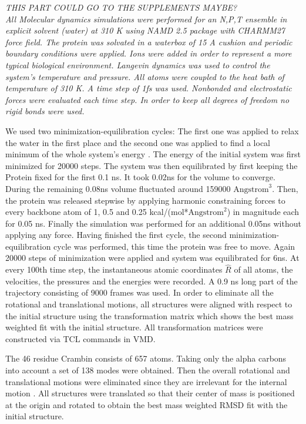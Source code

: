 \documentclass{article}
\begin{document}
{\it THIS PART COULD GO TO THE SUPPLEMENTS MAYBE?\\
All Molecular dynamics simulations were performed for an N,P,T
ensemble in explicit solvent (water) at 310 K using NAMD 2.5 package
with CHARMM27 force field. The protein was solvated in a waterbox of
15 A cushion and periodic boundary conditions were applied. Ions were
added in order to represent a more typical biological
environment. Langevin dynamics was used to control the system's
temperature and pressure. All atoms were coupled to the heat bath of
temperature of 310 K. A time step of 1fs was used. Nonbonded and
electrostatic forces were evaluated each time step. In order to keep
all degrees of freedom no rigid bonds were used.

We used two minimization-equilibration cycles: The first one was
applied to relax the water in the first place and the second one was
applied to find a local minimum of the whole system’s energy
\cite{NAMD2009}. The energy of the initial system was first minimized
for 20000 steps. The system was then equilibrated by first keeping the
Protein fixed for the first 0.1 ns. It took 0.02ns for the volume to
converge. During the remaining 0.08ns volume fluctuated around 159000
$\mbox{Angstrom}^3$. Then, the protein was released stepwise by
applying harmonic constraining forces to every backbone atom of 1, 0.5
and 0.25 kcal/(mol*$\mbox{Angstrom}^2$) in magnitude each for 0.05
ns. Finally the simulation was performed for an additional 0.05ns
without applying any force. Having finished the first cycle, the
second minimization-equilibration cycle was performed, this time the
protein was free to move. Again 20000 steps of minimization were
applied and system was equilibrated for 6ns.
At every 100th time step, the instantaneous atomic coordinates
$\hat{R}$ of all atoms, the velocities, the pressures and the energies
were recorded. A 0.9 ns long part of the trajectory consisting of 9000
frames was used. In order to eliminate all the rotational and
translational motions, all structures were aligned with respect to the
initial structure using the transformation matrix which shows the best
mass weighted fit with the initial structure. All transformation
matrices were constructed via TCL commands in VMD.}

The 46 residue Crambin consists of 657 atoms. Taking only the alpha
carbons into account a set of 138 modes were obtained. Then the
overall rotational and translational motions were eliminated since
they are irrelevant for the internal motion \cite{Moritsugu2003}. All
structures were translated so that their center of mass is positioned
at the origin and rotated to obtain the best mass weighted RMSD fit
with the initial structure.
\end{document}
